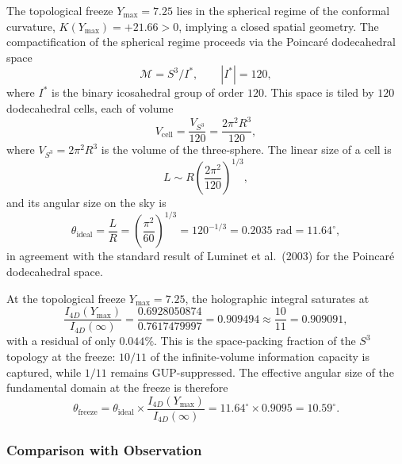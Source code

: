 \documentclass[12pt,oneside,openany]{book}
\begin{document}
The topological freeze $Y_{\max} = 7.25$ lies in the spherical regime of the conformal curvature, $K(Y_{\max}) = +21.66 > 0$, implying a closed spatial geometry. The compactification of the spherical regime proceeds via the Poincar\'e dodecahedral space
\begin{equation}
\mathcal{M} = S^3 / I^*, \qquad |I^*| = 120,
\label{eq:poincare-coldspot}
\end{equation}
where $I^*$ is the binary icosahedral group of order $120$. This space is tiled by $120$ dodecahedral cells, each of volume
\begin{equation}
V_{\mathrm{cell}} = \frac{V_{S^3}}{120} = \frac{2\pi^2 R^3}{120},
\label{eq:cell-volume}
\end{equation}
where $V_{S^3} = 2\pi^2 R^3$ is the volume of the three-sphere. The linear size of a cell is
\begin{equation}
L \sim R \left(\frac{2\pi^2}{120}\right)^{1/3},
\label{eq:cell-size}
\end{equation}
and its angular size on the sky is
\begin{equation}
\theta_{\mathrm{ideal}} = \frac{L}{R} = \left(\frac{\pi^2}{60}\right)^{1/3} = 120^{-1/3} = 0.2035 \text{ rad} = 11.64^\circ,
\label{eq:theta-ideal}
\end{equation}
in agreement with the standard result of Luminet et al.\ (2003) for the Poincar\'e dodecahedral space.

At the topological freeze $Y_{\max} = 7.25$, the holographic integral saturates at
\begin{equation}
\frac{I_{4D}(Y_{\max})}{I_{4D}(\infty)} = \frac{0.6928050874}{0.7617479997} = 0.909494 \approx \frac{10}{11} = 0.909091,
\label{eq:packing-fraction}
\end{equation}
with a residual of only $0.044\%$. This is the space-packing fraction of the $S^3$ topology at the freeze: $10/11$ of the infinite-volume information capacity is captured, while $1/11$ remains GUP-suppressed. The effective angular size of the fundamental domain at the freeze is therefore
\begin{equation}
\boxed{\theta_{\mathrm{freeze}} = \theta_{\mathrm{ideal}} \times \frac{I_{4D}(Y_{\max})}{I_{4D}(\infty)} = 11.64^\circ \times 0.9095 = 10.59^\circ.}
\label{eq:theta-freeze}
\end{equation}

\subsubsection{Comparison with Observation}
\end{document}
